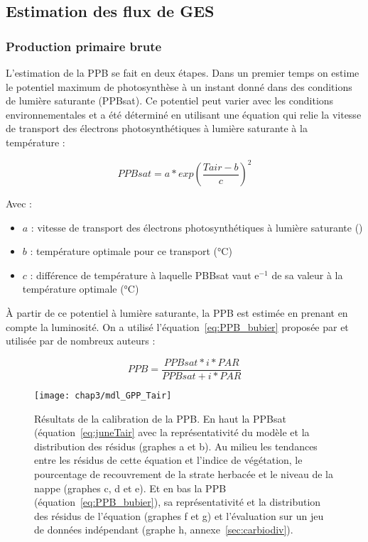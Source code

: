 \subsection{Estimation des flux de GES}

\subsubsection{Production primaire brute}


L'estimation de la PPB se fait en deux étapes.
Dans un premier temps on estime le potentiel maximum de photosynthèse à un instant donné dans des conditions de lumière saturante (PPBsat).
Ce potentiel peut varier avec les conditions environnementales et a été déterminé en utilisant une équation qui relie la vitesse de transport des électrons photosynthétiques à lumière saturante à la température \citep{june2004} :

\begin{equation}\label{eq:juneTair}
PPBsat = a * exp\left(\frac{Tair - b}{c}\right)^2
\end{equation}

Avec :
\begin{itemize}
\item $a$ : vitesse de transport des électrons photosynthétiques à lumière saturante (\si{\uml})
\item $b$ : température optimale pour ce transport (\si{\degreeCelsius})
\item $c$ : différence de température à laquelle PBBsat vaut e$^{-1}$ de sa valeur à la température optimale (\si{\degreeCelsius})
\end{itemize}

À partir de ce potentiel à lumière saturante, la PPB est estimée en prenant en compte la luminosité.
On a utilisé l'équation~\ref{eq:PPB_bubier} proposée par \citep{bubier1998} et utilisée par de nombreux auteurs \citep{bortoluzzi2006a,worrall2009}:

\begin{equation} \label{eq:PPB_bubier}
PPB = \frac{PPBsat * i * PAR}{PPBsat + i * PAR}
\end{equation}

\begin{figure} %
\centering
\texttt{[image: chap3/mdl\_GPP\_Tair]}
\caption{Résultats de la calibration de la PPB. En haut la PPBsat (équation~\ref{eq:juneTair} avec la représentativité du modèle et la distribution des résidus (graphes a et b). Au milieu les tendances entre les résidus de cette équation et l'indice de végétation, le pourcentage de recouvrement de la strate herbacée et le niveau de la nappe (graphes c, d et e). Et en bas la PPB (équation~\ref{eq:PPB_bubier}), sa représentativité et la distribution des résidus de l'équation (graphes f et g) et l'évaluation sur un jeu de données indépendant (graphe h, annexe~\ref{sec:carbiodiv}).}
\label{fig:mdl_GPP_Tair}
\end{figure}

